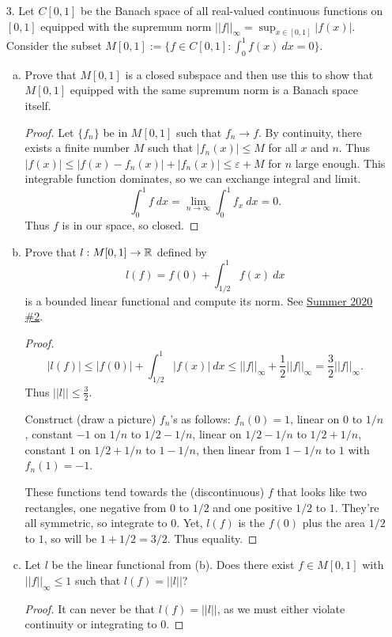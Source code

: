 \begin{itemize}
\item[3.] Let $C[0, 1]$ be the Banach space of all real-valued continuous functions on $[0, 1]$ equipped with the supremum norm $||f||_{\infty} = \sup_{x\in[0,1]} |f(x)|$. Consider the subset
$M[0, 1] := \{f \in C[0, 1] : \int_{0}^{1} f(x) \ dx = 0\}$.
\begin{enumerate}[(a)]
\item Prove that $M[0, 1]$ is a closed subspace and then use this to show that $M[0, 1]$
equipped with the same supremum norm is a Banach space itself.
\begin{proof}
Let $\{f_n\}$ be in $M[0, 1]$ such that $f_n \rightarrow f$. By continuity, there exists a finite number $M$ such that $|f_n(x)| \leq M$ for all $x$ and $n$. Thus $|f(x)| \leq |f(x)-f_n(x)| + |f_n(x)|\leq \varepsilon + M$ for $n$ large enough. This integrable function dominates, so we can exchange integral and limit.
$$\int_0^1 f \ dx = \lim_{n \rightarrow \infty} \int_0^1 f_x \ dx = 0.$$
Thus $f$ is in our space, so closed.
\end{proof}

\item Prove that $l:M[0, 1] \rightarrow \mathbb{R}$ defined by 
$$l(f) = f(0) + \int_{1/2}^{1} f(x) \ dx$$
is a bounded linear functional and compute its norm.
\label{q:s20-2}
See \hyperref[q:s20-2]{Summer 2020 \#2}.
\begin{proof}
$$|l(f)| \leq |f(0)| + \int_{1/2}^{1} |f(x)| \ dx \leq ||f||_{\infty} + \frac{1}{2}||f||_{\infty} = \frac{3}{2}||f||_{\infty}.$$ 
Thus $||l|| \leq \frac{3}{2}$. 

\medskip 

Construct (draw a picture) $f_n$'s as follows: $f_n(0)=1$, linear on $0$ to $1/n$, constant $-1$ on $1/n$ to  $1/2-1/n$, linear on $1/2-1/n$ to $1/2+1/n$, constant $1$ on $1/2+1/n$ to $1-1/n$, then linear from $1-1/n$ to $1$ with $f_n(1)=-1$.

\medskip 

These functions tend towards the (discontinuous) $f$ that looks like two rectangles, one negative from $0$ to $1/2$ and one positive $1/2$ to $1$. They're all symmetric, so integrate to $0$. Yet, $l(f)$ is the $f(0)$ plus the area $1/2$ to $1$, so will be $1 + 1/2 = 3/2$. Thus equality.
\end{proof}

\item Let $l$ be the linear functional from (b). Does there exist $f \in M[0, 1]$ with
$||f||_{\infty} \leq 1$ such that $l(f) = ||l||$?
\begin{proof}
It can never be that $l(f) = ||l||$, as we must either violate continuity or integrating to 0.
\end{proof}
\end{enumerate}





\end{itemize}
